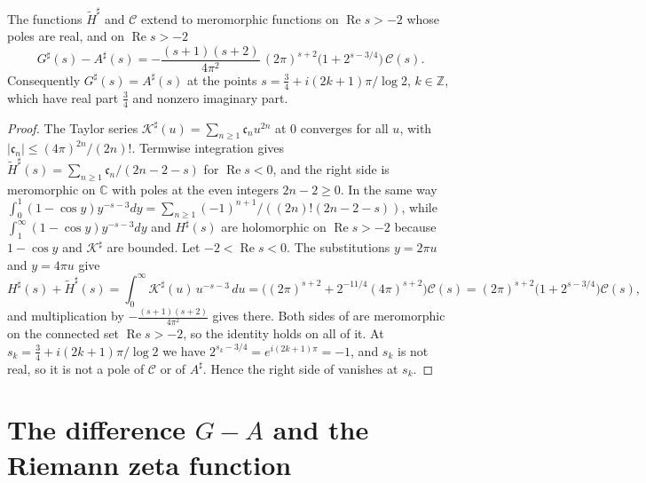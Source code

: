\begin{proposition}\label{prop:Ksharp}
The functions $\widetilde H^\sharp$ and $\mathcal C$ extend to meromorphic functions on $\operatorname{Re}s>-2$ whose poles are real, and on $\operatorname{Re}s>-2$
\begin{equation}\label{eq:GAsharp}
G^\sharp(s)-A^\sharp(s)=-\frac{(s+1)(s+2)}{4\pi^2}\,(2\pi)^{s+2}\bigl(1+2^{s-3/4}\bigr)\,\mathcal C(s) .
\end{equation}
Consequently $G^\sharp(s)=A^\sharp(s)$ at the points $s=\frac34+i(2k+1)\pi/\log2$, $k\in\mathbb Z$, which have real part $\frac34$ and nonzero imaginary part.
\end{proposition}

\begin{proof}
The Taylor series $\mathcal K^\sharp(u)=\sum_{n\ge1}\mathfrak c_nu^{2n}$ at $0$ converges for all $u$, with $|\mathfrak c_n|\le(4\pi)^{2n}/(2n)!$. Termwise integration gives $\widetilde H^\sharp(s)=\sum_{n\ge1}\mathfrak c_n/(2n-2-s)$ for $\operatorname{Re}s<0$, and the right side is meromorphic on $\mathbb C$ with poles at the even integers $2n-2\ge0$. In the same way $\int_0^1(1-\cos y)y^{-s-3}dy=\sum_{n\ge1}(-1)^{n+1}/((2n)!(2n-2-s))$, while $\int_1^\infty(1-\cos y)y^{-s-3}dy$ and $H^\sharp(s)$ are holomorphic on $\operatorname{Re}s>-2$ because $1-\cos y$ and $\mathcal K^\sharp$ are bounded. Let $-2<\operatorname{Re}s<0$. The substitutions $y=2\pi u$ and $y=4\pi u$ give
\begin{equation}\label{eq:HHsharp}
H^\sharp(s)+\widetilde H^\sharp(s)=\int_0^\infty\mathcal K^\sharp(u)\,u^{-s-3}\,du=\bigl((2\pi)^{s+2}+2^{-11/4}(4\pi)^{s+2}\bigr)\mathcal C(s)=(2\pi)^{s+2}\bigl(1+2^{s-3/4}\bigr)\mathcal C(s),
\end{equation}
and multiplication by $-\frac{(s+1)(s+2)}{4\pi^2}$ gives  there. Both sides of  are meromorphic on the connected set $\operatorname{Re}s>-2$, so the identity holds on all of it. At $s_k=\frac34+i(2k+1)\pi/\log2$ we have $2^{s_k-3/4}=e^{i(2k+1)\pi}=-1$, and $s_k$ is not real, so it is not a pole of $\mathcal C$ or of $A^\sharp$. Hence the right side of  vanishes at $s_k$.
\end{proof}

\section{The difference $G-A$ and the Riemann zeta function}\label{sec:zeta}

